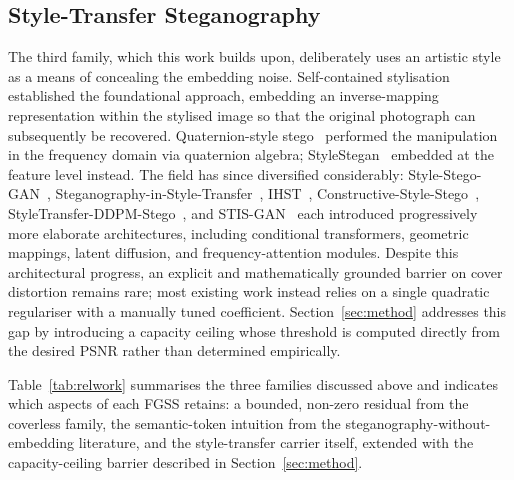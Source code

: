 \documentclass[conference]{IEEEtran}
\begin{document}
\subsection{Style-Transfer Steganography}
The third family, which this work builds upon, deliberately uses an artistic style as a means of concealing the embedding noise. Self-contained stylisation~\cite{wacv2020} established the foundational approach, embedding an inverse-mapping representation within the stylised image so that the original photograph can subsequently be recovered. Quaternion-style stego~\cite{quat2021} performed the manipulation in the frequency domain via quaternion algebra; StyleStegan~\cite{stylestegan2023} embedded at the feature level instead. The field has since diversified considerably: Style-Stego-GAN~\cite{sstegogan2024}, Steganography-in-Style-Transfer~\cite{sst2024}, IHST~\cite{ihst2024}, Constructive-Style-Stego~\cite{css2024}, StyleTransfer-DDPM-Stego~\cite{sddpm2025}, and STIS-GAN~\cite{stisgan2026} each introduced progressively more elaborate architectures, including conditional transformers, geometric mappings, latent diffusion, and frequency-attention modules. Despite this architectural progress, an explicit and mathematically grounded barrier on cover distortion remains rare; most existing work instead relies on a single quadratic regulariser with a manually tuned coefficient. Section~\ref{sec:method} addresses this gap by introducing a capacity ceiling whose threshold is computed directly from the desired PSNR rather than determined empirically.

Table~\ref{tab:relwork} summarises the three families discussed above and indicates which aspects of each FGSS retains: a bounded, non-zero residual from the coverless family, the semantic-token intuition from the steganography-without-embedding literature, and the style-transfer carrier itself, extended with the capacity-ceiling barrier described in Section~\ref{sec:method}.
\end{document}
